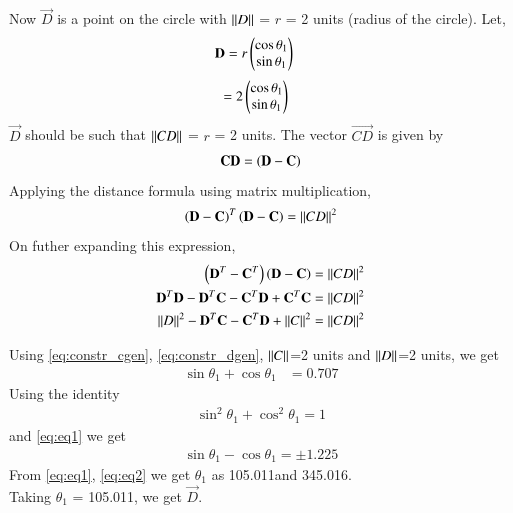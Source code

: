 \begin{enumerate}[label=\thesection.\arabic*.,ref=\thesection.\theenumi]
Now $\vec{D}$ is a point on the circle with $\left\lVert D\right\rVert$ = $r$ = 2 units (radius of the circle).
Let,
\begin{align}
\mathbf{D} & = r\begin{pmatrix}\cos\theta_1\\\sin\theta_1\end{pmatrix} 
\end{align}
\begin{align}
  & = 2\begin{pmatrix}\cos\theta_1\\\sin\theta_1\end{pmatrix}
\label{eq:constr_dgen}
\end{align}
$\vec{D}$ should be such that $\left\lVert CD\right\rVert$ = $r$ = 2 units. The vector $\vec{CD}$ is given by 
\begin{align}
\mathbf{CD} = \left(\mathbf{D} - \mathbf{C}\right)
\end{align}
Applying the distance formula using matrix multiplication,
\begin{align}
\left(\mathbf{D} - \mathbf{C}\right)^T\left(\mathbf{D} - \mathbf{C}\right) &= \left\lVert CD\right\rVert ^2\\
 \label{eq:dist_formula}
\end{align}
On futher expanding this expression,
\begin{align}
 \left(\mathbf{D}^T - \mathbf{C}^T\right)\left(\mathbf{D} - \mathbf{C}\right) &= \left\lVert CD\right\rVert ^2 \\
 \mathbf{D}^T\mathbf{D} - \mathbf{D}^T\mathbf{C} - \mathbf{C}^T\mathbf{D} + \mathbf{C}^T\mathbf{C} &= \left\lVert CD\right\rVert^2 \\
 \left\lVert D\right\rVert ^2 - \mathbf{D}^T\mathbf{C} - \mathbf{C}^T\mathbf{D} + \left\lVert C\right\rVert^2 &= \left\lVert CD\right\rVert^2 
\end{align}

Using \eqref{eq:constr_cgen}, \eqref{eq:constr_dgen}, $\left\lVert C\right\rVert$=2 units and $\left\lVert D\right\rVert$=2 units, we get 
\begin{align}
 \sin\theta_1 + \cos\theta_1 &= 0.707
  \label{eq:eq1}
\end{align}
Using the identity
 \begin{align}
   \sin^2\theta_1 + \cos^2 \theta_1 = 1
 \end{align}
 and  \eqref{eq:eq1} we get
  \begin{align}
  \sin\theta_1 - \cos\theta_1 =  \pm 1.225
  \label{eq:eq2}
  \end{align}
 From \eqref{eq:eq1}, \eqref{eq:eq2} we get $\theta_1$ as 105.011\degree and 345.016\degree.\\
 Taking $\theta_1$ = 105.011\degree, we get $\vec{D}$.


\end{enumerate}
